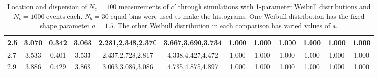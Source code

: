 \begin{table*}[h!]
\begin{center}
\begin{tabular}{| l | c | c | c | c | c | c | c | c | c | c | c |}
2.5 & 3.070 & 0.342 & 3.063 & 2.281,2.348,2.370 & 3.667,3.690,3.734  & 1.000  & 1.000  & 1.000  & 1.000  & 1.000  & 1.000 \\\hline
2.7 & 3.533 & 0.401 & 3.533 & 2.437,2.728,2.817 & 4.338,4.427,4.472  & 1.000  & 1.000  & 1.000  & 1.000  & 1.000  & 1.000 \\\hline
2.9 & 3.886 & 0.429 & 3.868 & 3.063,3.086,3.086 & 4.785,4.875,4.897  & 1.000  & 1.000  & 1.000  & 1.000  & 1.000  & 1.000 \\\hline
\end{tabular}
\caption{Location and dispersion of $N_c=100$
measurements of $c'$ through simulations
with 1-parameter Weibull distributions and $N_o=1000$ events each.
$N_b=30$ equal bins were used to make the histograms.
One Weibull distribution has the fixed shape parameter $a=1.5$.
The other Weibull distribution in each comparison
has varied values of $a$.}
\end{center}
\end{table*}